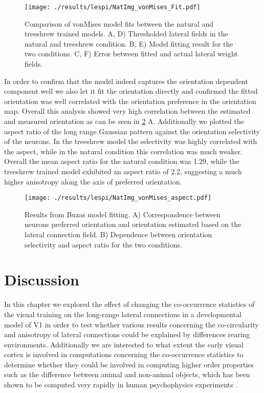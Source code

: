 \begin{figure}
	\centering
        \texttt{[image: ./results/lespi/NatImg\_vonMises\_Fit.pdf]}
	\caption[Comparison of \cite{Buzas2006} vonMises model fit between
      the natural and treeshrew trained models.]{Comparison of
      \cite{Buzas2006} vonMises model fits between the natural and
      treeshrew trained models. A, D) Thresholded lateral fields in
      the natural and treeshrew condition. B, E) Model fitting result
      for the two conditions. C, F) Error between fitted and actual
      lateral weight fields.}
	\label{NatImgvonMises}
\end{figure}

In order to confirm that the model indeed captures the orientation
dependent component well we also let it fit the orientation directly
and confirmed the fitted orientation was well correlated with the
orientation preference in the orientation map. Overall this analysis
showed very high correlation between the estimated and measured
orientation as can be seen in \ref{NatImgvonMisesAspect}
A. Additionally we plotted the aspect ratio of the long range Gaussian
pattern against the orientation selectivity of the neurons. In the
treeshrew model the selectivity was highly correlated with the aspect,
while in the natural condition this correlation was much
weaker. Overall the mean aspect ratio for the natural condition was
1.29, while the treeshrew trained model exhibited an aspect ratio of
2.2, suggesting a much higher anisotropy along the axis of preferred
orientation.

\begin{figure}
	\centering
        \texttt{[image: ./results/lespi/NatImg\_vonMises\_aspect.pdf]}
	\caption[Results from Buzas model fitting.]{Results from Buzas
      model fitting. A) Correspondence between neurons preferred
      orientation and orientation estimated based on the lateral
      connection field. B) Dependence between orientation selectivity
      and aspect ratio for the two conditions.}
	\label{NatImgvonMisesAspect}
\end{figure}

\section{Discussion}

In this chapter we explored the effect of changing the co-occurrence
statistics of the visual training on the long-range lateral
connections in a developmental model of V1 in order to test whether
various results concerning the co-circularity \citep{Hunt2011} and
anisotropy of lateral connections \citep{Bosking1997} could be
explained by differences rearing environments. Additionally we are
interested to what extent the early visual cortex is involved in
computations concerning the co-occurrence statistics to determine
whether they could be involved in computing higher order properties
such as the difference between animal and non-animal objects, which
has been shown to be computed very rapidly in human psychophysics
experiments \citep{Serre2007b}.

